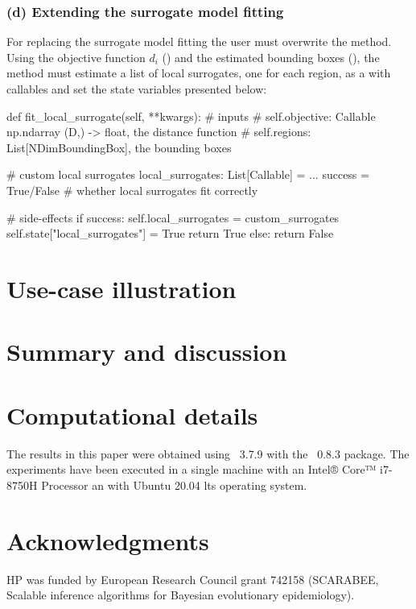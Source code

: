 \documentclass[article]{jss}
\begin{document}
\subsubsection*{(d) Extending the surrogate model fitting}

For replacing the surrogate model fitting the user must overwrite the
 method. Using the objective function
\(d_i\) () and the estimated bounding boxes
(), the method must estimate a list of local
surrogates, one for each region, as a  with callables and
set the state variables presented below:

\begin{Code}
def fit_local_surrogate(self, **kwargs):
    # inputs
    # self.objective: Callable np.ndarray (D,) -> float, the distance function
    # self.regions: List[NDimBoundingBox], the bounding boxes

    # custom local surrogates
    local_surrogates: List[Callable] = ...
    success = True/False # whether local surrogates fit correctly

    # side-effects
    if success:
        self.local_surrogates = custom_surrogates
        self.state["local_surrogates"] = True
        return True
    else:
        return False
\end{Code}






\section{Use-case illustration}


\section{Summary and discussion} \label{sec:summary}



\section*{Computational details}

The results in this paper were obtained using ~3.7.9
with the ~0.8.3 package. The experiments have been executed
in a single machine with an Intel® Core™ i7-8750H Processor an with
Ubuntu 20.04 lts operating system.

\section*{Acknowledgments}

HP was funded by European Research Council grant 742158 (SCARABEE,
Scalable inference algorithms for Bayesian evolutionary epidemiology).

\clearpage


\end{document}

